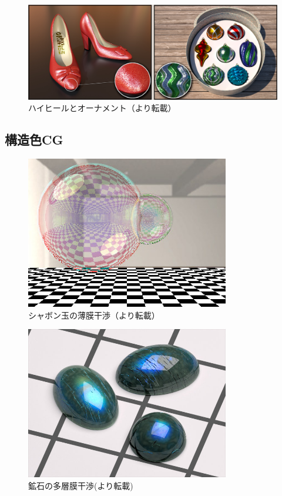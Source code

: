 \begin{figure}[hn]
  \centering
  \includegraphics[width=5.0in]{./img/heel_ornament.jpg}
  \caption{ハイヒールとオーナメント（\cite{jakob2014discrete}より転載）}
  \label{FHeelOrnament}
\end{figure}


\subsection{構造色CG}

\begin{figure}[htbp]
  \centering
  \includegraphics[width=3.5in]{./img/syabon_iwasaki.jpg}
  \caption{シャボン玉の薄膜干渉（\cite{iwasaki2004real}より転載）}
  \label{FSyabon}
\end{figure}

\begin{figure}[htbp]
  \centering
  \includegraphics[width=3.5in]{./img/kouseki_weidlich.jpg}
  \caption{鉱石の多層膜干渉(\cite{weidlich2009rendering}より転載)}
  \label{FKouseki}
\end{figure}

